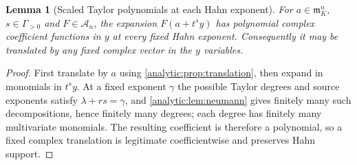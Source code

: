\documentclass[11pt,letterpaper]{article}
\newtheorem{lemma}[theorem]{Lemma}
\theoremstyle{definition}
\theoremstyle{remark}
\newcommand{\A}{\mathscr A}
\newcommand{\m}{\mathfrak m}
\numberwithin{equation}{section}
\begin{document}
\begin{lemma}[Scaled Taylor polynomials at each Hahn exponent]
\label{analytic:lem:scaled-polynomial}
For $a\in\m_K^n$, $s\in\Gamma_{>0}$ and $F\in\A_n$, the expansion
$F(a+t^sy)$ has polynomial complex coefficient functions in $y$ at every
fixed Hahn exponent. Consequently it may be translated by any fixed complex
vector in the $y$ variables.
\end{lemma}
\begin{proof}
First translate by $a$ using \cref{analytic:prop:translation}, then expand
in monomials in $t^sy$. At a fixed exponent $\gamma$ the possible Taylor
degrees and source exponents satisfy $\lambda+rs=\gamma$, and
\cref{analytic:lem:neumann} gives finitely many such decompositions, hence
finitely many degrees; each degree has finitely many multivariate
monomials. The resulting coefficient is therefore a polynomial, so a fixed
complex translation is legitimate coefficientwise and preserves Hahn
support.
\end{proof}
\end{document}
